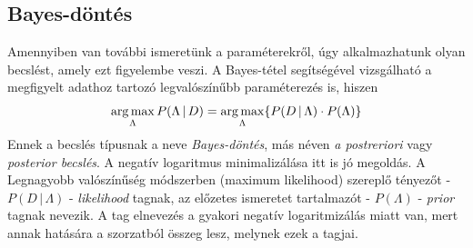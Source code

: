 \subsection{Bayes-döntés}
Amennyiben van további ismeretünk a paraméterekről, úgy alkalmazhatunk olyan becslést, amely ezt figyelembe veszi. A Bayes-tétel segítségével vizsgálható a megfigyelt adathoz tartozó legvalószínűbb paraméterezés is, hiszen
$$\operatorname*{arg\,max}_{\Lambda}{P(\Lambda\,|\,D)} = \operatorname*{arg\,max}_{\Lambda}\{P(D\,|\,\Lambda) \cdot P(\Lambda)\}$$
Ennek a becslés típusnak a neve \emph{Bayes-döntés}, más néven \emph{a postreriori} vagy \emph{posterior becslés}. A negatív logaritmus minimalizálása itt is jó megoldás. A Legnagyobb valószínűség módszerben (maximum likelihood) szereplő tényezőt - $P(D\,|\,\Lambda)$ - \emph{likelihood} tagnak, az előzetes ismeretet tartalmazót - $P(\Lambda)$ - \emph{prior} tagnak nevezik. A tag elnevezés a gyakori negatív logaritmizálás miatt van, mert annak hatására a szorzatból összeg lesz, melynek ezek a tagjai.


